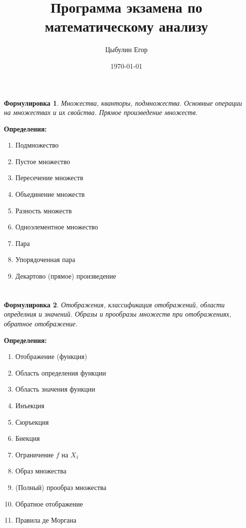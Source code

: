 \documentclass[a4paper]{article}
\title{Программа экзамена по математическому анализу}
\author{Цыбулин Егор}
\date{\today}
\theoremstyle{plain}
\newtheorem*{st}{Формулировка}
\theoremstyle{definition}
\theoremstyle{remark}
\begin{document}
\maketitle
\section{}
\begin{st}
    Множества, кванторы, подмножества. Основные операции на множествах и их свойства. Прямое произведение множеств.
\end{st}

\textbf{Определения:}
\begin{enumerate}
    \item Подмножество
    \item Пустое множество
    \item Пересечение множеств
    \item Объединение множеств
    \item Разность множеств
    \item Одноэлементное множество
    \item Пара
    \item Упорядоченная пара
    \item Декартово (прямое) произведение
\end{enumerate}


\section{}
\begin{st}
    Отображения, классификация отображений, области определния и значений. Образы и прообразы множеств при отображениях, обратное отображение.
\end{st}

\textbf{Определения:}
\begin{enumerate}
    \item Отображение (функция)
    \item Область определения функции
    \item Область значения функции
    \item Инъекция
    \item Сюръекция
    \item Биекция
    \item Ограничение $f$ на $X_1$
    \item Образ множества
    \item (Полный) прообраз множества
    \item Обратное отображение
    \item Правила де Моргана
\end{enumerate}
\end{document}
